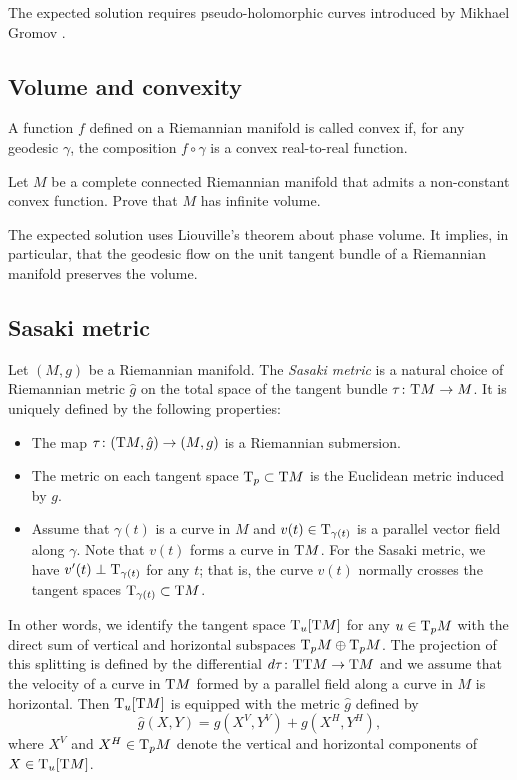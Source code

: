 The expected solution requires pseudo-holomorphic curves introduced by Mikhael Gromov \cite{gromov-pseudoholomorphic,donaldson2005}.

\subsection*{Volume and convexity\thm}
\label{Volume and convexity} 

A function $f$ defined on a Riemannian manifold is called convex if, for any geodesic $\gamma$, the composition $f\circ\gamma$ is a convex real-to-real function.

\begin{pr}
Let $M$ be a complete connected Riemannian manifold that admits a non-constant convex function.
Prove that $M$ has infinite volume.
\end{pr}

The expected solution uses Liouville's theorem about phase volume.
It implies, in particular, that the geodesic flow on the unit tangent bundle of a Riemannian manifold preserves the volume.


\subsection*{Sasaki metric}
\label{pr:Sasaki metric}

Let $(M,g)$ be a Riemannian manifold.
The \emph{Sasaki metric} \cite{sasaki1958} is a natural choice of Riemannian metric $\hat g$ on the total space of the tangent bundle $\tau\colon\mathrm{T} M\to M$.
It is uniquely defined by the following properties:
\begin{itemize}
\item The map $\tau\colon(\mathrm{T} M,\hat g)\to (M,g)$ is a Riemannian submersion.
\item The metric on each tangent space $\mathrm{T}_p\subset \mathrm{T} M$ is the Euclidean metric induced by $g$.
\item Assume that $\gamma(t)$ is a curve in $M$ and $v(t)\in\mathrm{T}_{\gamma(t)}$ is a parallel vector field along $\gamma$. 
Note that $v(t)$ forms a curve in $\mathrm{T} M$.
For the Sasaki metric, we have $v'(t)\perp \mathrm{T}_{\gamma(t)}$ for any $t$;
that is, the curve $v(t)$ normally crosses the tangent spaces $\mathrm{T}_{\gamma(t)}\subset \mathrm{T} M$.
\end{itemize}

In other words, we identify the tangent space 
$\mathrm{T}_u[\mathrm{T} M]$ for any $u\z\in \T_p M$ with the direct sum of vertical and horizontal subspaces $\T_p M\z\oplus \T_p M$.
The projection of this splitting is defined by the differential $d\tau\colon\mathrm{T}\mathrm{T} M\to \mathrm{T} M$
and we assume that the velocity of a curve in $\mathrm{T} M$ formed by a parallel field along a curve in $M$ is horizontal.
Then $\mathrm{T}_u[\mathrm{T} M]$ is equipped with the metric $\hat g$ defined by
\[\hat g(X,Y)=g(X^V,Y^V)+g(X^H,Y^H),\]
where $X^V$ and $X^H\in\mathrm{T}_pM$ denote the vertical and horizontal components of $X\in\mathrm{T}_u[\mathrm{T} M]$.



